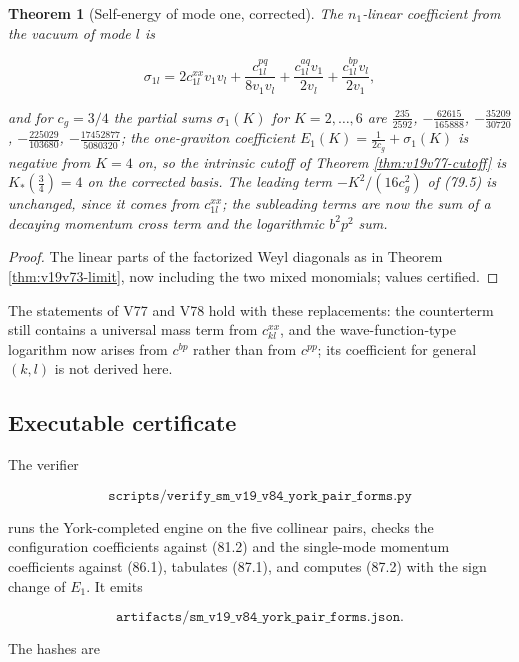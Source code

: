 \documentclass[11pt]{article}
\newtheorem{theorem}{Theorem}[section]
\theoremstyle{remark}
\begin{document}
\begin{theorem}[Self-energy of mode one, corrected]
\label{thm:v19v84-self-energy}
The \(n_1\)-linear coefficient from the vacuum of mode \(l\) is

\[
 \sigma_{1l}=2c^{xx}_{1l}v_1v_l+\frac{c^{pq}_{1l}}{8v_1v_l}
 +\frac{c^{aq}_{1l}v_1}{2v_l}+\frac{c^{bp}_{1l}v_l}{2v_1},              \tag{87.2}
\]

and for \(c_g=3/4\) the partial sums \(\sigma_1(K)\) for \(K=2,\dots,6\)
are \(\tfrac{235}{2592}\), \(-\tfrac{62615}{165888}\), \(-\tfrac{35209}{30720}\),
\(-\tfrac{225029}{103680}\), \(-\tfrac{17452877}{5080320}\); the
one-graviton coefficient \(E_1(K)=\tfrac1{2c_g}+\sigma_1(K)\) is
negative from \(K=4\) on, so the intrinsic cutoff of Theorem
\ref{thm:v19v77-cutoff} is \(K_*(\tfrac34)=4\) on the corrected basis.
The leading term \(-K^2/(16c_g^2)\) of (79.5) is unchanged, since it
comes from \(c^{xx}_{1l}\); the subleading terms are now the sum of a
decaying momentum cross term and the logarithmic \(b^2p^2\) sum.
\end{theorem}

\begin{proof}
The linear parts of the factorized Weyl diagonals as in Theorem
\ref{thm:v19v73-limit}, now including the two mixed monomials; values
certified.
\end{proof}

The statements of V77 and V78 hold with these replacements: the
counterterm still contains a universal mass term from
\(c^{xx}_{kl}\), and the wave-function-type logarithm now arises from
\(c^{bp}\) rather than from \(c^{pp}\); its coefficient for general
\((k,l)\) is not derived here.

\subsection{Executable certificate}

The verifier

\[
 \texttt{scripts/verify\_sm\_v19\_v84\_york\_pair\_forms.py}         \tag{87.3}
\]

runs the York-completed engine on the five collinear pairs, checks
the configuration coefficients against (81.2) and the single-mode
momentum coefficients against (86.1), tabulates (87.1), and computes
(87.2) with the sign change of \(E_1\).  It emits

\[
 \texttt{artifacts/sm\_v19\_v84\_york\_pair\_forms.json}.            \tag{87.4}
\]

The hashes are
\end{document}
